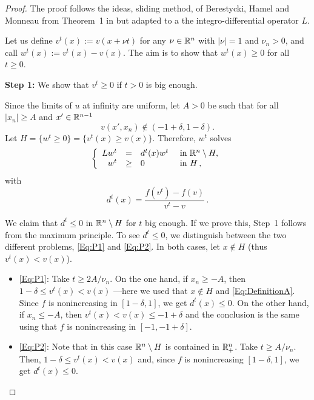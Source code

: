 \begin{proof}
The proof follows the ideas, sliding method, of Berestycki, Hamel and Monneau from Theorem~1 in \cite{BerestyckiHamelMonneau} but adapted to a the integro-differential operator $L$.

Let us define $ v^t(x) := v(x+\nu t) $ for any $\nu\in\mathbb{R}^n$ with $|\nu|=1$ and $\nu_n>0$, and call $w^t(x):=v^t(x)-v(x)$. The aim is to show that $w^t(x)\geq 0$ for all $t\geq 0$.


\textbf{Step 1:} We show that $v^t\geq 0$ if $t>0$ is big enough.

Since the limits of $u$ at infinity are uniform, let $A>0$ be such that for all $|x_n|\geq A$ and $x'\in \mathbb{R}^{n-1}$
\begin{equation}
\label{Eq:DefinitionA}
v(x',x_n)\not\in (-1+\delta,1-\delta).
\end{equation}
Let $H=\{w^t\geq 0\} = \{v^t(x) \geq v(x)\}$. Therefore, $w^t$ solves
$$
\left\{\begin{array}{rcll}
L w^t &=& d^t(x) w^t  &\textrm{ in }\mathbb{R}^n\setminus H,\\
w^t &\geq& 0  &\textrm{ in } H\,,
\end{array} \right.
$$
with 
\begin{equation}
\label{Eq:Definition_dt}
d^t(x) = \frac{f(v^t) - f(v)}{v^t-v} \,.
\end{equation} 

We claim that $d^t \leq 0$ in $\mathbb{R}^n\setminus H$ for $t$ big enough. If we prove this, Step~1 follows from the maximum principle. To see $d^t \leq 0$, we distinguish between the two different problems, \eqref{Eq:P1} and \eqref{Eq:P2}. In both cases, let $x\not\in H$ (thus $v^t(x) < v(x)$).

\begin{itemize}
	\item \eqref{Eq:P1}: Take $t\geq 2A/\nu_n$.
	On the one hand, if $x_n\geq -A$, then $1-\delta \leq v^t(x) < v(x)$ ---here we used that $x\not\in H$ and \eqref{Eq:DefinitionA}. Since $f$ is nonincreasing in $[1-\delta, 1]$, we get $d^t(x) \leq 0$. On the other hand, if $x_n\leq -A$, then $v^t(x) < v(x) \leq -1+\delta$ and the conclusion is the same using that $f$ is nonincreasing in $[-1, -1+\delta]$. 
	
	\item \eqref{Eq:P2}: Note that in this case $\mathbb{R}^n\setminus H$ is contained in $\mathbb{R}^n_+$. Take $t\geq A/\nu_n$.  Then, $1-\delta \leq v^t(x) < v(x)$ and, since $f$ is nonincreasing $[1-\delta, 1]$, we get $d^t(x) \leq 0$.	
\end{itemize}




\end{proof}
